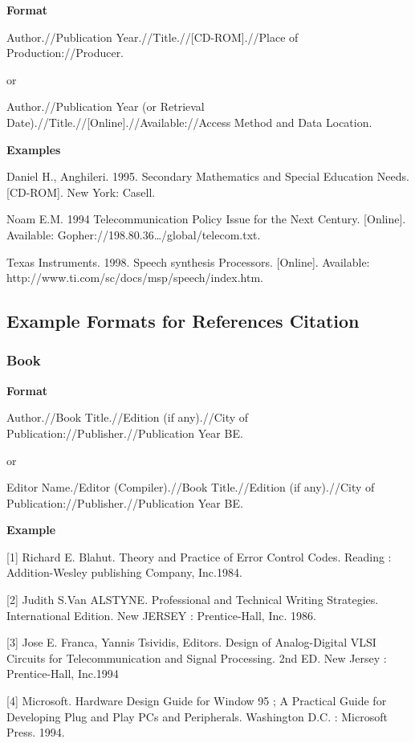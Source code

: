 \textbf{Format}

Author.//Publication Year.//Title.//[CD-ROM].//Place of Production://Producer.

or

Author.//Publication Year (or Retrieval Date).//Title.//[Online].//Available://Access Method and Data Location.

\textbf{Examples}

Daniel H., Anghileri. 1995. Secondary Mathematics and Special Education Needs. [CD-ROM]. New York: Casell.

Noam E.M. 1994 Telecommunication Policy Issue for the Next Century. [Online]. Available: Gopher://198.80.36…/global/telecom.txt.

Texas Instruments. 1998. Speech synthesis Processors. [Online]. Available: http://www.ti.com/sc/docs/msp/speech/index.htm.

\subsection{Example Formats for References Citation}

\subsubsection{Book}

\textbf{Format}

Author.//Book Title.//Edition (if any).//City of Publication://Publisher.//Publication Year BE.

or

Editor Name./Editor (Compiler).//Book Title.//Edition (if any).//City of Publication://Publisher.//Publication Year BE.

\textbf{Example}

[1] Richard E. Blahut. Theory and Practice of Error Control Codes. Reading : Addition-Wesley publishing Company, Inc.1984.

[2] Judith S.Van ALSTYNE. Professional and Technical Writing Strategies. International Edition. New JERSEY : Prentice-Hall, Inc. 1986.

[3] Jose E. Franca, Yannis Tsividis, Editors. Design of Analog-Digital VLSI Circuits for Telecommunication and Signal Processing. 2nd ED. New Jersey : Prentice-Hall, Inc.1994

[4] Microsoft. Hardware Design Guide for Window 95 ; A Practical Guide for Developing Plug and Play PCs and Peripherals. Washington D.C. : Microsoft Press. 1994.

